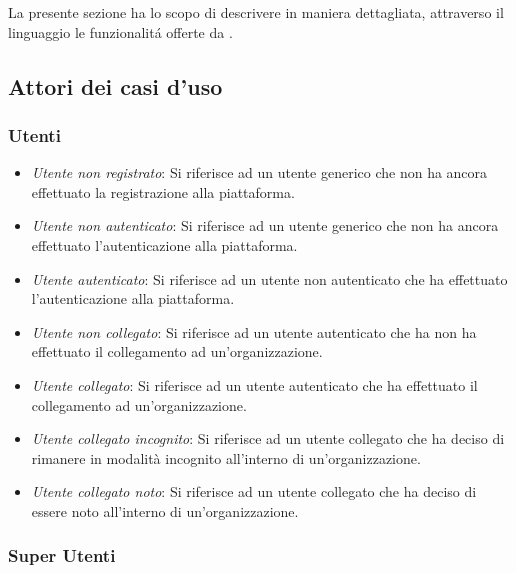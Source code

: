 \documentclass[../analisi-dei-requisiti]{subfiles}
\begin{document}
La presente sezione ha lo scopo di descrivere in maniera dettagliata, attraverso il linguaggio  le funzionalitá offerte da .

\subsection{Attori dei casi d'uso}
\label{sub:attori_casi_duso}

\subsubsection{Utenti}
\label{subsub:utenti}


\begin{itemize}
  \item \emph{Utente non registrato}: Si riferisce ad un utente generico che non ha ancora effettuato la registrazione alla piattaforma.
  \item \emph{Utente non autenticato}: Si riferisce ad un utente generico che non ha ancora effettuato l'autenticazione alla piattaforma.
  \item \emph{Utente autenticato}: Si riferisce ad un utente non autenticato che ha effettuato l'autenticazione alla piattaforma.
  \item \emph{Utente non collegato}: Si riferisce ad un utente autenticato che ha non ha effettuato il collegamento ad un'organizzazione.
  \item \emph{Utente collegato}: Si riferisce ad un utente autenticato che ha effettuato il collegamento ad un'organizzazione.
  \item \emph{Utente collegato incognito}: Si riferisce ad un utente collegato che ha deciso di rimanere in modalità incognito all'interno di un'organizzazione.
  \item \emph{Utente collegato noto}: Si riferisce ad un utente collegato che ha deciso di essere noto all'interno di un'organizzazione.
\end{itemize}

\subsubsection{Super Utenti}
\label{subsub:super_utenti}
\end{document}
